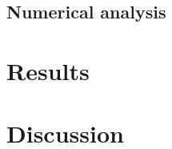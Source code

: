 \documentclass{imammb}
\numberwithin{equation}{section}
\begin{document}


\subsection{Numerical analysis} %


\section{Results}

\section{Discussion}


 










\end{document}
